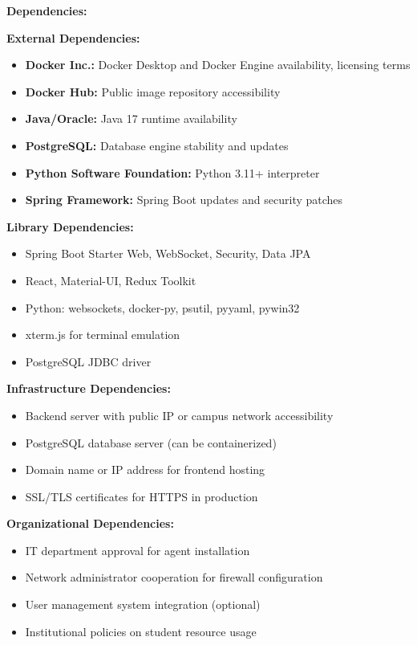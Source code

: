 \documentclass[12pt,a4paper]{article}
\begin{document}
\textbf{Dependencies:}

\textbf{External Dependencies:}
\begin{itemize}[noitemsep]
    \item \textbf{Docker Inc.:} Docker Desktop and Docker Engine availability, licensing terms
    \item \textbf{Docker Hub:} Public image repository accessibility
    \item \textbf{Java/Oracle:} Java 17 runtime availability
    \item \textbf{PostgreSQL:} Database engine stability and updates
    \item \textbf{Python Software Foundation:} Python 3.11+ interpreter
    \item \textbf{Spring Framework:} Spring Boot updates and security patches
\end{itemize}

\textbf{Library Dependencies:}
\begin{itemize}[noitemsep]
    \item Spring Boot Starter Web, WebSocket, Security, Data JPA
    \item React, Material-UI, Redux Toolkit
    \item Python: websockets, docker-py, psutil, pyyaml, pywin32
    \item xterm.js for terminal emulation
    \item PostgreSQL JDBC driver
\end{itemize}

\textbf{Infrastructure Dependencies:}
\begin{itemize}[noitemsep]
    \item Backend server with public IP or campus network accessibility
    \item PostgreSQL database server (can be containerized)
    \item Domain name or IP address for frontend hosting
    \item SSL/TLS certificates for HTTPS in production
\end{itemize}

\textbf{Organizational Dependencies:}
\begin{itemize}[noitemsep]
    \item IT department approval for agent installation
    \item Network administrator cooperation for firewall configuration
    \item User management system integration (optional)
    \item Institutional policies on student resource usage
\end{itemize}
\end{document}
